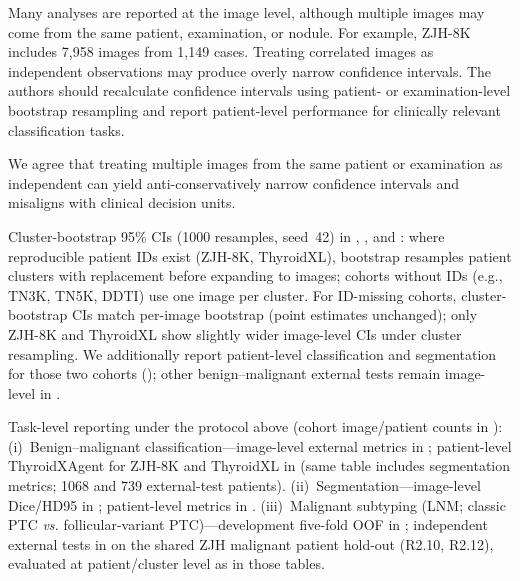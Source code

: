 \begin{reviewercomment}
Many analyses are reported at the image level, although multiple images may come from the same patient, examination, or nodule. For example, ZJH-8K includes 7,958 images from 1,149 cases. Treating correlated images as independent observations may produce overly narrow confidence intervals. The authors should recalculate confidence intervals using patient- or examination-level bootstrap resampling and report patient-level performance for clinically relevant classification tasks.
\end{reviewercomment}
\begin{authorresponse}
We agree that treating multiple images from the same patient or examination as independent can yield anti-conservatively narrow confidence intervals and misaligns with clinical decision units.\par
Cluster-bootstrap 95\% CIs (1000 resamples, seed~42) in , , and : where reproducible patient IDs exist (ZJH-8K, ThyroidXL), bootstrap resamples patient clusters with replacement before expanding to images; cohorts without IDs (e.g., TN3K, TN5K, DDTI) use one image per cluster. For ID-missing cohorts, cluster-bootstrap CIs match per-image bootstrap (point estimates unchanged); only ZJH-8K and ThyroidXL show slightly wider image-level CIs under cluster resampling. We additionally report patient-level classification and segmentation for those two cohorts (); other benign--malignant external tests remain image-level in .\par
Task-level reporting under the protocol above (cohort image/patient counts in ): (i)~Benign--malignant classification---image-level external metrics in ; patient-level ThyroidXAgent for ZJH-8K and ThyroidXL in  (same table includes segmentation metrics; 1068 and 739 external-test patients). (ii)~Segmentation---image-level Dice/HD95 in ; patient-level metrics in . (iii)~Malignant subtyping (LNM; classic PTC \emph{vs.} follicular-variant PTC)---development five-fold OOF in ; independent external tests in  on the shared ZJH malignant patient hold-out (R2.10, R2.12), evaluated at patient/cluster level as in those tables.\par
\noindent\par
\par
\end{authorresponse}

